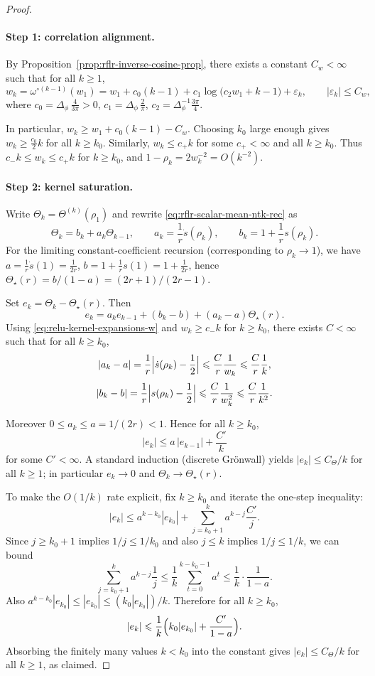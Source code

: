 \begin{proof}
\paragraph{Step 1: correlation alignment.}
By Proposition~\ref{prop:rflr-inverse-cosine-prop}, there exists a constant \(C_w<\infty\) such that for all \(k\ge 1\),
\[
w_k=\omega^{\circ(k-1)}(w_1)
= w_1 + c_0 (k-1) + c_1 \log\!\bigl(c_2 w_1 + k - 1\bigr) + \varepsilon_k,
\qquad |\varepsilon_k|\le C_w,
\]
where \(c_0=\Delta_\phi\,\frac{4}{3\pi}>0\), \(c_1=\Delta_\phi\,\frac{2}{\pi}\), \(c_2=\Delta_\phi^{-1}\frac{3\pi}{4}\).

\medskip\noindent
In particular, \(w_k\ge w_1+c_0(k-1)-C_w\). Choosing \(k_0\) large enough gives \(w_k\ge \frac{c_0}{2}k\) for all \(k\ge k_0\). Similarly, \(w_k\le c_+k\) for some \(c_+<\infty\) and all \(k\ge k_0\). Thus \(c_-k\le w_k\le c_+k\) for \(k\ge k_0\), and \(1-\rho_k=2w_k^{-2}=O(k^{-2})\).

\paragraph{Step 2: kernel saturation.}
Write \(\Theta_k=\Theta^{(k)}(\rho_1)\) and rewrite \eqref{eq:rflr-scalar-mean-ntk-rec} as
\[
\Theta_k=b_k+a_k\Theta_{k-1},\qquad a_k=\frac{1}{r}\dot{s}(\rho_k),\qquad b_k=1+\frac{1}{r}s(\rho_k).
\]
For the limiting constant-coefficient recursion (corresponding to \(\rho_k\to 1\)), we have \(a=\frac{1}{r}\dot{s}(1)=\frac{1}{2r}\), \(b=1+\frac{1}{r}s(1)=1+\frac{1}{2r}\), hence \(\Theta_\star(r)=b/(1-a)=(2r+1)/(2r-1)\).

Set \(e_k=\Theta_k-\Theta_\star(r)\). Then
\[
e_k=a_k e_{k-1} + (b_k-b) + (a_k-a)\Theta_\star(r).
\]
Using \eqref{eq:relu-kernel-expansions-w} and \(w_k\ge c_-k\) for \(k\ge k_0\), there exists \(C<\infty\) such that for all \(k\ge k_0\),
\[
|a_k-a|
=\frac{1}{r}\Bigl|\dot{s}(\rho_k)-\frac12\Bigr|
\le \frac{C}{r}\frac{1}{w_k}
\le \frac{C}{r}\frac{1}{k},
\]
\[
|b_k-b|
=\frac{1}{r}\Bigl|s(\rho_k)-\frac12\Bigr|
\le \frac{C}{r}\frac{1}{w_k^2}
\le \frac{C}{r}\frac{1}{k^2}.
\]

\medskip\noindent
Moreover \(0\le a_k\le a=1/(2r)<1\). Hence for all \(k\ge k_0\),
\[
|e_k|\le a\,|e_{k-1}|+\frac{C'}{k}
\]
for some \(C'<\infty\). A standard induction (discrete Grönwall) yields \(|e_k|\le C_\Theta/k\) for all \(k\ge 1\); in particular \(e_k\to 0\) and \(\Theta_k\to\Theta_\star(r)\).

\medskip\noindent
To make the \(O(1/k)\) rate explicit, fix \(k\ge k_0\) and iterate the one-step inequality:
\[
|e_k|
\le a^{k-k_0}|e_{k_0}| + \sum_{j=k_0+1}^{k} a^{k-j}\frac{C'}{j}.
\]
Since \(j\ge k_0+1\) implies \(1/j\le 1/k_0\) and also \(j\le k\) implies \(1/j\le 1/k\), we can bound
\[
\sum_{j=k_0+1}^{k} a^{k-j}\frac{1}{j}
\le \frac{1}{k}\sum_{t=0}^{k-k_0-1} a^{t}
\le \frac{1}{k}\cdot\frac{1}{1-a}.
\]
Also \(a^{k-k_0}|e_{k_0}|\le |e_{k_0}|\le (k_0|e_{k_0}|)/k\). Therefore for all \(k\ge k_0\),
\[
|e_k|\le \frac{1}{k}\Bigl(k_0|e_{k_0}|+\frac{C'}{1-a}\Bigr).
\]
Absorbing the finitely many values \(k<k_0\) into the constant gives \(|e_k|\le C_\Theta/k\) for all \(k\ge 1\), as claimed.


\end{proof}
